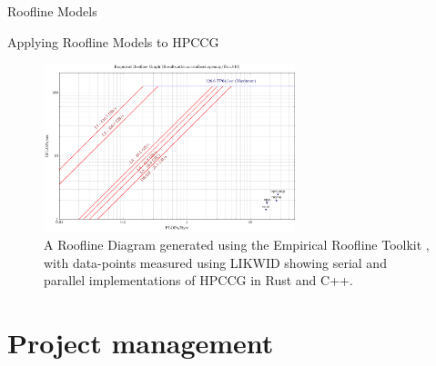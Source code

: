 \documentclass[10pt,aspectratio=169]{beamer}
\begin{document}


\begin{frame}{Roofline Models}
\end{frame}

\begin{frame}{Applying Roofline Models to HPCCG}
    \begin{figure}[H]
        \includegraphics[width=0.65\textwidth]{images/Athena_ERT_generated_roofline.pdf}
        \caption{A Roofline Diagram generated using the Empirical Roofline Toolkit \cite{yangEmpiricalRooflineMethodology2018}, with data-points measured using LIKWID \cite{treibigLIKWIDLightweightPerformance2012} showing serial and parallel implementations of HPCCG in Rust and C++.}
        \label{fig:intelvtune}
    \end{figure}
\end{frame}



\section{Project management}
\end{document}
